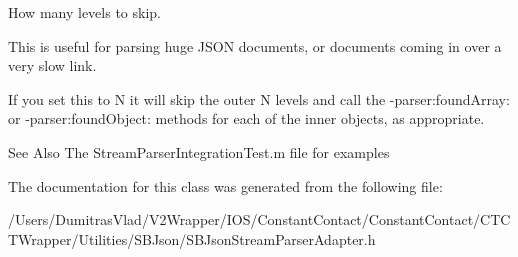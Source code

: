 How many levels to skip. 

This is useful for parsing huge J\-S\-O\-N documents, or documents coming in over a very slow link.

If you set this to N it will skip the outer N levels and call the -\/parser\-:found\-Array\-: or -\/parser\-:found\-Object\-: methods for each of the inner objects, as appropriate.

\begin{DoxySeeAlso}{See Also}
The Stream\-Parser\-Integration\-Test.\-m file for examples 
\end{DoxySeeAlso}


The documentation for this class was generated from the following file\-:\begin{DoxyCompactItemize}
\item 
/\-Users/\-Dumitras\-Vlad/\-V2\-Wrapper/\-I\-O\-S/\-Constant\-Contact/\-Constant\-Contact/\-C\-T\-C\-T\-Wrapper/\-Utilities/\-S\-B\-Json/S\-B\-Json\-Stream\-Parser\-Adapter.\-h\end{DoxyCompactItemize}
